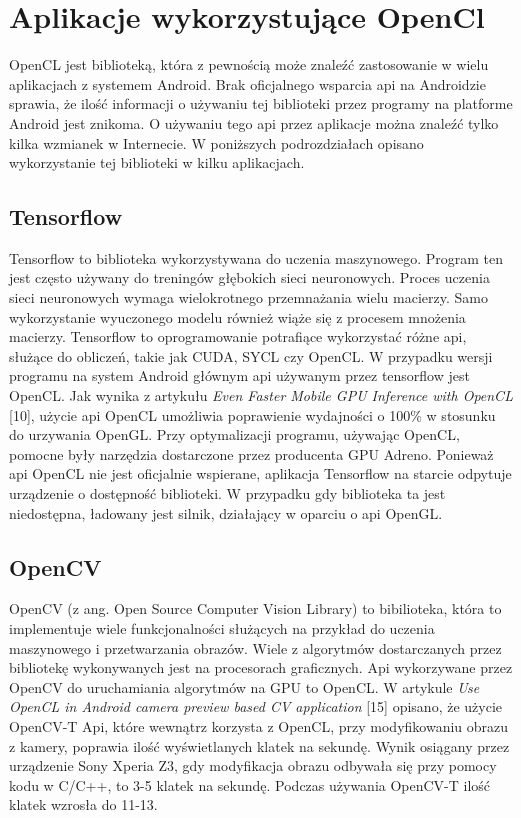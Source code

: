 \section[Aplikacje wykorzystujące OpenCl]{Aplikacje wykorzystujące OpenCl}
OpenCL jest biblioteką, która z pewnością może znaleźć zastosowanie w wielu aplikacjach z systemem Android. Brak oficjalnego wsparcia api na Androidzie sprawia, że ilość informacji o używaniu tej biblioteki przez programy na platforme Android jest znikoma. O używaniu tego api przez aplikacje można znaleźć tylko kilka wzmianek w Internecie. W poniższych podrozdziałach opisano wykorzystanie tej biblioteki w kilku aplikacjach.
\subsection[Tensorflow]{Tensorflow}
Tensorflow to biblioteka wykorzystywana do uczenia maszynowego. Program ten jest często używany do treningów głębokich sieci neuronowych. Proces uczenia sieci neuronowych wymaga wielokrotnego przemnażania wielu macierzy. Samo wykorzystanie wyuczonego modelu również wiąże się z procesem mnożenia macierzy. Tensorflow to oprogramowanie potrafiące wykorzystać różne api, służące do obliczeń, takie jak CUDA, SYCL czy OpenCL. W przypadku wersji programu na system Android głównym api używanym przez tensorflow jest OpenCL. Jak wynika z artykułu \emph{Even Faster Mobile GPU Inference with OpenCL} [10], użycie api OpenCL umożliwia poprawienie wydajności o 100\% w stosunku do urzywania OpenGL. Przy optymalizacji programu, używając OpenCL, pomocne były narzędzia dostarczone przez producenta GPU Adreno. Ponieważ api OpenCL nie jest oficjalnie wspierane, aplikacja Tensorflow na starcie odpytuje urządzenie o dostępność biblioteki. W przypadku gdy biblioteka ta jest niedostępna, ładowany jest silnik, działający w oparciu o api OpenGL.
\subsection[OpenCV]{OpenCV}
OpenCV (z ang. Open Source Computer Vision Library) to bibilioteka, która to implementuje wiele funkcjonalności służących na przykład do uczenia maszynowego i przetwarzania obrazów. Wiele z algorytmów dostarczanych przez bibliotekę wykonywanych jest na procesorach graficznych. Api wykorzywane przez OpenCV do uruchamiania algorytmów na GPU to OpenCL. W artykule \emph{Use OpenCL in Android camera preview based CV application} [15] opisano, że użycie OpenCV-T Api, które wewnątrz korzysta z OpenCL, przy modyfikowaniu obrazu z kamery, poprawia ilość wyświetlanych klatek na sekundę. Wynik osiągany przez urządzenie Sony Xperia Z3, gdy modyfikacja obrazu odbywała się przy pomocy kodu w C/C++, to 3-5 klatek na sekundę. Podczas używania OpenCV-T ilość klatek wzrosła do 11-13.
